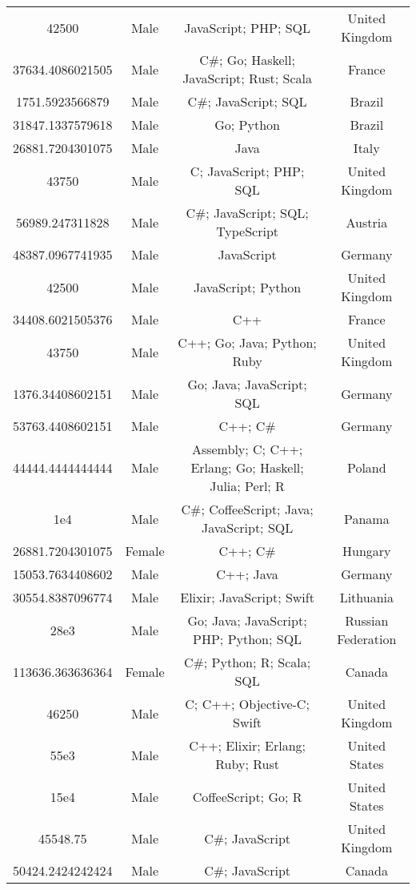 \begin{center}
\begin{tabular}{ |c|c|c|c| }
42500  &  Male  &  JavaScript; PHP; SQL  &  United Kingdom  \\ 
37634.4086021505  &  Male  &  C\#; Go; Haskell; JavaScript; Rust; Scala  &  France  \\ 
1751.5923566879  &  Male  &  C\#; JavaScript; SQL  &  Brazil  \\ 
31847.1337579618  &  Male  &  Go; Python  &  Brazil  \\ 
26881.7204301075  &  Male  &  Java  &  Italy  \\ 
43750  &  Male  &  C; JavaScript; PHP; SQL  &  United Kingdom  \\ 
56989.247311828  &  Male  &  C\#; JavaScript; SQL; TypeScript  &  Austria  \\ 
48387.0967741935  &  Male  &  JavaScript  &  Germany  \\ 
42500  &  Male  &  JavaScript; Python  &  United Kingdom  \\ 
34408.6021505376  &  Male  &  C++  &  France  \\ 
43750  &  Male  &  C++; Go; Java; Python; Ruby  &  United Kingdom  \\ 
1376.34408602151  &  Male  &  Go; Java; JavaScript; SQL  &  Germany  \\ 
53763.4408602151  &  Male  &  C++; C\#  &  Germany  \\ 
44444.4444444444  &  Male  &  Assembly; C; C++; Erlang; Go; Haskell; Julia; Perl; R  &  Poland  \\ 
1e4  &  Male  &  C\#; CoffeeScript; Java; JavaScript; SQL  &  Panama  \\ 
26881.7204301075  &  Female  &  C++; C\#  &  Hungary  \\ 
15053.7634408602  &  Male  &  C++; Java  &  Germany  \\ 
30554.8387096774  &  Male  &  Elixir; JavaScript; Swift  &  Lithuania  \\ 
28e3  &  Male  &  Go; Java; JavaScript; PHP; Python; SQL  &  Russian Federation  \\ 
113636.363636364  &  Female  &  C\#; Python; R; Scala; SQL  &  Canada  \\ 
46250  &  Male  &  C; C++; Objective-C; Swift  &  United Kingdom  \\ 
55e3  &  Male  &  C++; Elixir; Erlang; Ruby; Rust  &  United States  \\ 
15e4  &  Male  &  CoffeeScript; Go; R  &  United States  \\ 
45548.75  &  Male  &  C\#; JavaScript  &  United Kingdom  \\ 
50424.2424242424  &  Male  &  C\#; JavaScript  &  Canada  \\ 

\end{tabular}
\end{center}
